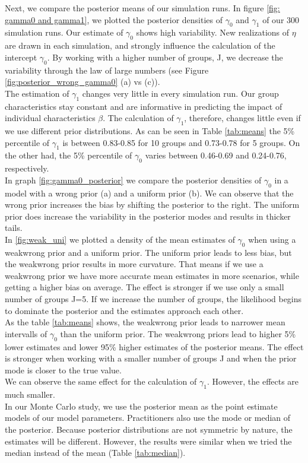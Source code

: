 Next, we compare the posterior means of our simulation runs. In figure \ref{fig: gamma0 and gamma1}, we plotted the posterior densities of $\gamma_0$ and $\gamma_1$ of our 300 simulation runs. Our estimate of $\gamma_0$ shows high variability. New realizations of $\eta$ are drawn in each simulation, and strongly influence the calculation of the intercept $\gamma_0$. By working with a higher number of groups, J, we decrease the variability through the law of large numbers (see Figure \ref{fig:posterior_wrong_gamma0} (a) vs (c)).\\
The estimation of $\gamma_1$ changes very little in every simulation run. Our group characteristics stay constant and are informative in predicting the impact of individual characteristics $\beta$.
The calculation of $\gamma_1$, therefore, changes little even if we use different prior distributions. As can be seen in Table \ref{tab:means} the 5\% percentile of $\gamma_1$ is between 0.83-0.85 for 10 groups and 0.73-0.78 for 5 groups.
On the other had, the 5\% percentile of $\gamma_0$ varies between 0.46-0.69 and 0.24-0.76, respectively.\\
In graph \ref{fig:gamma0_posterior} we compare the posterior densities of $\gamma_0$ in a model with a wrong prior (a) and a uniform prior (b). We can observe that the wrong prior increases the bias by shifting the posterior to the right. The uniform prior does increase the variability in the posterior modes and results in thicker tails.\\
In \ref{fig:weak_uni} we plotted a density of the mean estimates of $\gamma_0$ when using a weakwrong prior and a uniform prior. The uniform prior leads to less bias, but the weakwrong prior results in more curvature.  That means if we use a weakwrong prior we have more accurate mean estimates in more scenarios, while getting a higher bias on average. The effect is stronger if we use only a small number of groups J=5. If we increase the number of groups, the likelihood begins to dominate the posterior and the estimates approach each other. \\
As the table \ref{tab:means} shows, the weakwrong prior leads to narrower mean intervalls of $\gamma_0$ than the uniform prior. The weakwrong priors lead to higher 5\% lower estimates and lower 95\% higher estimates of the posterior means. The effect is stronger when working with a smaller number of groups J and when the prior mode is closer to the true value.\\
We can observe the same effect for the calculation of $\gamma_1$. However, the effects are much smaller.\\
In our Monte Carlo study, we use the posterior mean as the point estimate models of our model parameters. Practitioners also use the mode or median of the posterior. Because posterior distributions are not symmetric by nature, the estimates will be different. However, the results were similar when we tried the median instead of the mean (Table \ref{tab:median}).\\

